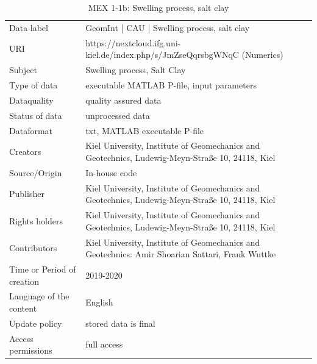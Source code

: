 \begin{table}[!ht]
\caption{MEX 1-1b: Swelling process, salt clay}
\label{tab:dms-mex1-1b}
\small
\begin{tabular}{R{3cm}|L{7cm}}
\hline
%
Data label & GeomInt | CAU | Swelling process, salt clay\\
URI &  https://nextcloud.ifg.uni-kiel.de/index.php/s/JmZseQqrsbgWNqC (Numerics)\\
Subject  &  Swelling process, Salt Clay\\
Type of data  & executable MATLAB P-file, input parameters\\
Dataquality  &  quality assured data \\
Status of data  &  unprocessed data\\
Dataformat  & txt, MATLAB executable P-file\\
Creators  &  Kiel University, Institute of Geomechanics and Geotechnics, Ludewig-Meyn-Stra\ss e 10, 24118, Kiel\\
Source/Origin & In-house code \\
Publisher  &  Kiel University, Institute of Geomechanics and Geotechnics, Ludewig-Meyn-Stra\ss e 10, 24118, Kiel \\
Rights holders &  Kiel University, Institute of Geomechanics and Geotechnics, Ludewig-Meyn-Stra\ss e 10, 24118, Kiel \\
Contributors &   Kiel University, Institute of Geomechanics and Geotechnics: Amir Shoarian Sattari, Frank Wuttke\\
Time or Period of creation &  2019-2020\\
Language of the content &  English\\
Update policy &  stored data is final\\
Access permissions & full access\\
%
\hline
\end{tabular}
\end{table}